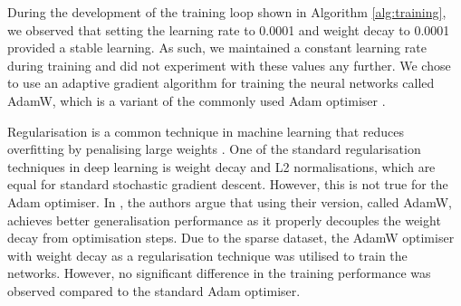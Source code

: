 \documentclass[
  digital,     %
  oneside,     %
  nosansbold,  %
  nocolorbold, %
  lof,         %
  lot,         %
]{fithesis4}
\begin{document}
During the development of the training loop shown in Algorithm \ref{alg:training}, we observed that setting the learning rate to 0.0001 and weight decay to 0.0001 provided a stable learning. As such, we maintained a constant learning rate during training and did not experiment with these values any further. We chose to use an adaptive gradient algorithm for training the neural networks called AdamW, which is a variant of the commonly used Adam optimiser \parencite{loshchilov2019}.

Regularisation is a common technique in machine learning that reduces overfitting by penalising large weights \parencite{Bishop2024DeepLearning}. One of the standard regularisation techniques in deep learning is weight decay and L2 normalisations, which are equal for standard stochastic gradient descent. However, this is not true for the Adam optimiser. In \parencite{loshchilov2019}, the authors argue that using their version, called AdamW, achieves better generalisation performance as it properly decouples the weight decay from optimisation steps. Due to the sparse dataset, the AdamW optimiser with weight decay as a regularisation technique was utilised to train the networks. However, no significant difference in the training performance was observed compared to the standard Adam optimiser.

\begin{algorithm}
    \small  
    \caption{Quadrant-based Model Training}
    \setlength{\lineskip}{-2pt}        %
    \setlength{\baselineskip}{8pt}      %
    \setlength{\parskip}{0pt}           %
    \label{alg:training}

\end{algorithm}
\clearpage
\end{document}
